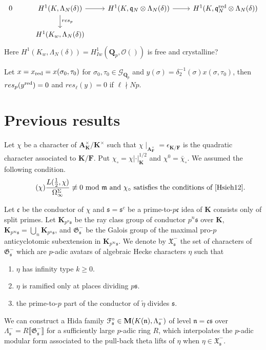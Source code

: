 \documentclass[leqno]{amsart}
\newcommand{\euF}{\EuScript{F}} %
\newcommand{\M}{\mathbf{M}} %
\newcommand{\fG}{\mathfrak{G}}
\newcommand{\fX}{\mathfrak{X}}
\newcommand{\Gp}{\mathcal{G}_{\Qp}} %
\newcommand{\red}{\textnormal{red}}
\newcommand{\Qp}{\mathbf{Q}_p}
\newcommand{\A}{\mathbf A}
\newcommand{\F}{{\mathbf{F}}} %
\newcommand{\K}{{\mathbf{K}}} %
\newcommand{\qch}{\epsilon} %
\newcommand{\oo}{\mathcal{O}} %
\newcommand{\fc}{\mathfrak{c}}
\newcommand{\fs}{\mathfrak{s}}
\newcommand{\fm}{\mathfrak{m}}
\newcommand{\fn}{\mathfrak{n}}
\newcommand{\fq}{\mathfrak{q}}
\theoremstyle{definition}
\theoremstyle{remark}
\begin{document}
\[
\begin{tikzcd}
0&
H^1(K,\Lambda_N(\delta)) \arrow[r]\arrow[d,"res_p"]&
H^1(K,\fq_N\otimes \Lambda_N(\delta)) \arrow[r]&
H^1(K,\fq_N^{\red}\otimes \Lambda_N(\delta))\\
&H^1(K_w,\Lambda_N(\delta))
\end{tikzcd}
\]
Here $H^1(K_w,\Lambda_N(\delta))=H_{Iw}^1(\Qp,\oo())$
is free and crystalline?

Let $x=x_{\red}=x(\sigma_0,\tau_0)$
for $\sigma_0,\tau_0\in \Gp$
and  $y(\sigma)=\delta_2^{-1}(\sigma)x(\sigma,\tau_0)$,
then $res_p(y^{\red})=0$
and $res_\ell(y)=0$ if  $\ell\nmid Np$.

\section{Previous results}

\cite{lee}

Let $\chi$ be a character of $\A_{\K}^\times/\K^\times$
such that $\chi\mid_{\A_\F^\times}=\qch_{\K/\F}$
is the quadratic character associated to $\K/\F$.
Put $\chi_\circ=\chi|\cdot|_{\K}^{1/2}$ and $\chi^0=\bar{\chi}_\circ$.
We assumed the following condition.
\begin{equation}\label{cond:chi}\tag{$\chi$}
    \frac{L(\frac{1}{2},\chi)}{\Omega_\infty^{\Sigma}}\not\equiv 0\text{ mod } \fm
    \text{ and } \chi_\circ
    \text{ satisfies the conditions of \cite[Theorem A]{Hsieh12}}.
\end{equation}

Let $\fc$ be the conductor of $\chi$ and $\fs=\fs^c$ be a prime-to-$p\fc$
idea of $\K$ consists only of split primes.
Let $\K_{p^n\fs}$ be the ray class group of conductor $p^n\fs$ over $\K$,
$\K_{p^\infty\fs}=\bigcup_{n}\K_{p^n\fs}$,
and $\fG_{\fs}^-$ be the Galois group of the maximal pro-$p$ anticyclotomic
subextension in $\K_{p^\infty\fs}$.
We denote by $\fX_{\fs}^-$
the set of characters of $\fG_{\fs}^-$
which are $p$-adic avatars of 
algebraic Hecke characters $\eta$ such that 
\begin{enumerate}
    \item $\eta$ has infinity type $k\geq 0$.
    \item $\eta$ is ramified only at places dividing $p\fs$.
    \item the prime-to-$p$ part of the conductor of $\tilde{\eta}$ divides $\fs$.
\end{enumerate}
We can construct a Hida family $\euF^\circ_{\fs}\in \M(K(\fn),\Lambda_{\fs}^-)$
of level $\fn=\fc\fs$ over $\Lambda_{\fs}^-=R\llbracket \fG_{\fs}^-\rrbracket$ for 
a sufficiently large $p$-adic ring $R$,
which interpolates the $p$-adic modular form
associated to the pull-back theta lifts of $\eta$ when $\eta\in \fX_{\fs}^-$.
\end{document}
